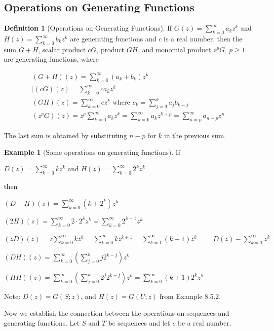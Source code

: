 \documentclass[10pt,]{book}
\theoremstyle{plain}
\theoremstyle{definition}
\newtheorem{definition}[theorem]{Definition}
\theoremstyle{definition}
\theoremstyle{definition}
\newtheorem{example}[theorem]{Example}
\theoremstyle{definition}
\numberwithin{equation}{section}
\begin{document}
\subsection[Operations on Generating Functions]{Operations on Generating Functions}\label{sss-operations-on-generating-functions}
\begin{definition}[Operations on Generating Functions]\label{definition-16}
If  \(G(z)=\sum_{k=0}^{\infty} a_k z^k\) and \(H(z) =\sum_{k=0}^{\infty} b_k z^k\)
are generating functions and \(c\) is a real number, then the sum \(G + H\), scalar product \(c G\), product \(G H\), and monomial product \(z^p G\), \(p \geq  1\) are generating functions, where

\begin{gather}
(G + H)(z)=\sum_{k=0}^{\infty} \left(a_k+b_k\right) z^k\label{gf-sum}\\
[(c G)(z)=\sum_{k=0}^{\infty} c a_k z^k\label{gf-scalarmult}\\
(G H)(z) = \sum_{k=0}^{\infty} c z^k \textrm{ where } c_k= \sum_{j=0}^k a_jb_{k-j}\label{gf-product}\\
\left(z^p G\right)(z) = z^p\sum_{k=0}^{\infty} a_k z^k=\sum_{k=0}^{\infty} a_k z^{k+p} = \sum_{n=p}^{\infty} a_{n-p} z^n\label{gf-shift}
\end{gather}
%
\par
The last sum is obtained by substituting \(n - p\) for \(k\) in the previous sum.%
\end{definition}
\begin{example}[Some operations on generating functions]\label{ex-some-gf-operations}
If

\(D(z) =\sum_{k=0}^{\infty} kz^k\) and \(H(z) =\sum_{k=0}^{\infty} 2^k z^k\) 

then

\((D + H)(z) =\sum_{k=0}^{\infty} \left(k+2^k\right) z^k\) 

\((2H)(z)= \sum_{k=0}^{\infty} 2\cdot 2^kz^k =\sum_{k=0}^{\infty} 2^{k+1}z^k\)

 \((z D)(z) = z\sum_{k=0}^{\infty} kz^k= \sum_{k=0}^{\infty} kz^{k+1}= \sum_{k=1}^{\infty} (k-1)
z^k \quad = D(z)- \sum_{k=1}^{\infty} z^k\)

\((D H)(z)=\sum_{k=0}^{\infty} \left(\sum_{j=0}^k j 2^{k-j}\right)z^k\)

\((H H)(z)= \sum_{k=0}^{\infty} \left(\sum_{j=0}^k 2^j2^{k-j}\right) z^k=\sum_{k=0}^{\infty} (k+1)2^k z^k\)%
\par
Note: \(D(z) = G(S;z)\), and \(H(z) = G(U;z)\) from Example 8.5.2.%
\end{example}
Now we establish the connection between the operations on sequences and generating
functions. Let \(S\) and \(T\) be sequences and let \(c\) be a real number.
\end{document}
